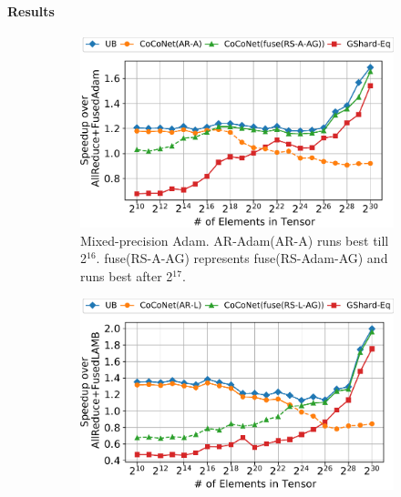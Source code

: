 \paragraph{Results}
\begin{figure}[t]
	\centering
    \begin{subfigure}{0.93\linewidth}
    \centering
    \includegraphics[width=\linewidth]{figures/results-adamfp16-256-gpus.pdf}  
    \caption{Mixed-precision Adam. AR-Adam(AR-A) runs best till 2$^{16}$. fuse(RS-A-AG) represents fuse(RS-Adam-AG) and runs best after 2$^{17}$.}
    \label{fig:bandwidth64GPUs:adam}
  \end{subfigure}
  \par \bigskip%
  \begin{subfigure}{0.93\linewidth}
    \centering
    \includegraphics[width=\linewidth]{figures/results-lambfp16-256-gpus.pdf}  

\end{subfigure}
\end{figure}

